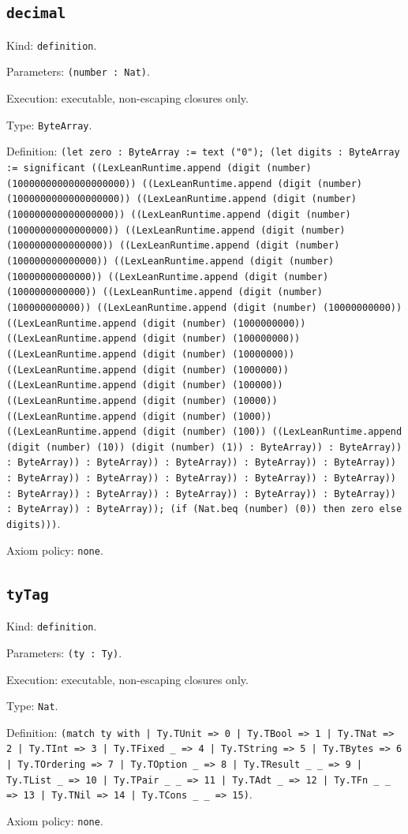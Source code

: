 \documentclass[11pt]{article}
\begin{document}
\subsection*{\texttt{decimal}}
\noindent Kind: \texttt{definition}.\par
\noindent Parameters: \texttt{(number : Nat)}.\par
\noindent Execution: executable, non-escaping closures only.\par
\noindent Type: \texttt{ByteArray}.\par
\noindent Definition: \texttt{(let zero : ByteArray := text ("0"); (let digits : ByteArray := significant ((LexLeanRuntime.append (digit (number) (10000000000000000000)) ((LexLeanRuntime.append (digit (number) (1000000000000000000)) ((LexLeanRuntime.append (digit (number) (100000000000000000)) ((LexLeanRuntime.append (digit (number) (10000000000000000)) ((LexLeanRuntime.append (digit (number) (1000000000000000)) ((LexLeanRuntime.append (digit (number) (100000000000000)) ((LexLeanRuntime.append (digit (number) (10000000000000)) ((LexLeanRuntime.append (digit (number) (1000000000000)) ((LexLeanRuntime.append (digit (number) (100000000000)) ((LexLeanRuntime.append (digit (number) (10000000000)) ((LexLeanRuntime.append (digit (number) (1000000000)) ((LexLeanRuntime.append (digit (number) (100000000)) ((LexLeanRuntime.append (digit (number) (10000000)) ((LexLeanRuntime.append (digit (number) (1000000)) ((LexLeanRuntime.append (digit (number) (100000)) ((LexLeanRuntime.append (digit (number) (10000)) ((LexLeanRuntime.append (digit (number) (1000)) ((LexLeanRuntime.append (digit (number) (100)) ((LexLeanRuntime.append (digit (number) (10)) (digit (number) (1)) : ByteArray)) : ByteArray)) : ByteArray)) : ByteArray)) : ByteArray)) : ByteArray)) : ByteArray)) : ByteArray)) : ByteArray)) : ByteArray)) : ByteArray)) : ByteArray)) : ByteArray)) : ByteArray)) : ByteArray)) : ByteArray)) : ByteArray)) : ByteArray)) : ByteArray)); (if (Nat.beq (number) (0)) then zero else digits)))}.\par
\noindent Axiom policy: \texttt{none}.\par
\subsection*{\texttt{tyTag}}
\noindent Kind: \texttt{definition}.\par
\noindent Parameters: \texttt{(ty : Ty)}.\par
\noindent Execution: executable, non-escaping closures only.\par
\noindent Type: \texttt{Nat}.\par
\noindent Definition: \texttt{(match ty with | Ty.TUnit => 0 | Ty.TBool => 1 | Ty.TNat => 2 | Ty.TInt => 3 | Ty.TFixed \_ => 4 | Ty.TString => 5 | Ty.TBytes => 6 | Ty.TOrdering => 7 | Ty.TOption \_ => 8 | Ty.TResult \_ \_ => 9 | Ty.TList \_ => 10 | Ty.TPair \_ \_ => 11 | Ty.TAdt \_ => 12 | Ty.TFn \_ \_ => 13 | Ty.TNil => 14 | Ty.TCons \_ \_ => 15)}.\par
\noindent Axiom policy: \texttt{none}.\par
\end{document}
